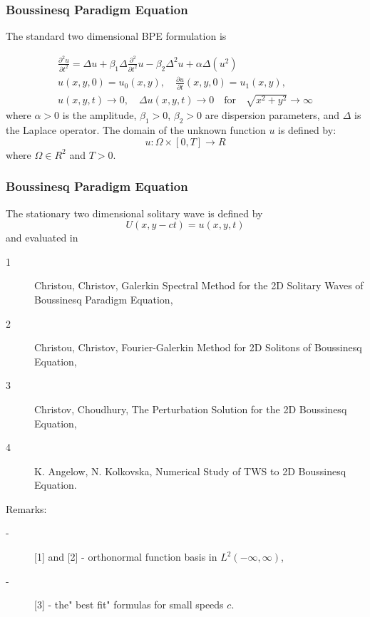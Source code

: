 \documentclass{beamer}
\newcommand{\be}{\begin{equation}}
\newcommand{\ee}{\end{equation}}
\begin{document}
\begin{frame}
\frametitle{Boussinesq Paradigm Equation}


The standard two dimensional BPE formulation is

\begin{align}\label{problem}
 \frac{\partial^2 u}{\partial t^2}= \Delta u + \beta_1 \Delta \frac{\partial^2}{\partial t^2} u -  \beta_2 \Delta^2 u +  \alpha \Delta (u^2)
\\
u(x,y,0) = u_0(x,y), \quad \frac{\partial u}{\partial t}(x,y,0)=u_1(x,y), \nonumber
\\
u(x,y,t) \rightarrow 0, \quad \Delta u(x,y, t) \rightarrow 0 \quad \text{for} \quad \sqrt{x^2+y^2} \rightarrow \infty \nonumber
\end{align}
where $\alpha>0$ is the amplitude, $\beta_1>0$, $\beta_2>0$  are dispersion parameters, and $\Delta$ is the Laplace operator. The domain of the unknown function $u$ is defined by:
\be
 u:\Omega \times [0, T] \rightarrow R
\ee
where $\Omega \in R^2$ and $T>0$.
\end{frame}


\begin{frame}
\frametitle{Boussinesq Paradigm Equation}


The stationary two dimensional solitary wave is defined by
$$U(x, y-ct) = u(x, y, t)$$
and evaluated in 
\begin{description}
 \item[1] Christou, Christov, Galerkin Spectral Method for the 2D Solitary Waves of Boussinesq Paradigm Equation, 
 \item[2] Christou, Christov, Fourier-Galerkin Method for 2D Solitons of Boussinesq Equation, 
  \item[3] Christov, Choudhury, The Perturbation Solution for the 2D Boussinesq Equation,
  \item[4] K. Angelow, N. Kolkovska, Numerical Study of TWS to 2D Boussinesq Equation.
\end{description}

Remarks:
\begin{description}
 \item[-] [1] and [2] - orthonormal function basis in $L^2(-\infty, \infty)$,
  \item[-] [3] - the" best fit" formulas for small speeds $c$.
\end{description}
\end{frame}
\end{document}
